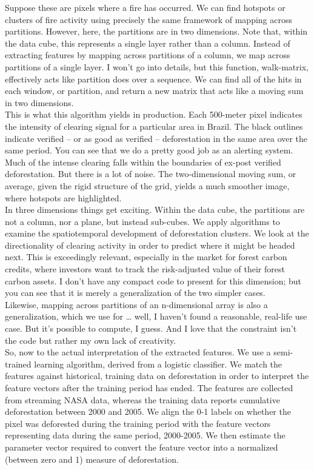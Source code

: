 \documentclass{article}
\begin{document}
Suppose these are pixels where a fire has occurred.  We can find
hotspots or clusters of fire activity using precisely the same
framework of mapping across partitions.  However, here, the partitions
are in two dimensions.  Note that, within the data cube, this
represents a single layer rather than a column.  Instead of extracting
features by mapping across partitions of a column, we map across
partitions of a single layer.  I won't go into details, but this
function, walk-matrix, effectively acts like partition does over a
sequence.  We can find all of the hits in each window, or partition,
and return a new matrix that acts like a moving sum in two dimensions.  \\

This is what this algorithm yields in production.  Each 500-meter
pixel indicates the intensity of clearing signal for a particular area
in Brazil.  The black outlines indicate verified -- or as good as
verified -- deforestation in the same area over the same period.  You
can see that we do a pretty good job as an alerting system.  Much of
the intense clearing falls within the boundaries of ex-post verified
deforestation.  But there is a lot of noise.  The two-dimensional
moving sum, or average, given the rigid structure of the grid, yields
a much smoother image, where hotspots are highlighted.\\

In three dimensions things get exciting.  Within the data cube, the
partitions are not a column, nor a plane, but instead sub-cubes.  We
apply algorithms to examine the spatiotemporal development of
deforestation clusters.  We look at the directionality of clearing
activity in order to predict where it might be headed next.  This is
exceedingly relevant, especially in the market for forest carbon
credits, where investors want to track the risk-adjusted value of
their forest carbon assets.  I don't have any compact code to present
for this dimension; but you can see that it is merely a generalization
of the two simpler cases.\\

Likewise, mapping across partitions of an n-dimensional array is also
a generalization, which we use for \ldots{} well, I haven't found a
reasonable, real-life use case.  But it's possible to compute, I
guess.  And I love that the constraint isn't the code but rather my
own lack of creativity.\\

So, now to the actual interpretation of the extracted features.  We
use a semi-trained learning algorithm, derived from a logistic
classifier.  We match the features against historical, training data
on deforestation in order to interpret the feature vectors after the
training period has ended.  The features are collected from streaming
NASA data, whereas the training data reports cumulative deforestation
between 2000 and 2005.  We align the 0-1 labels on whether the pixel
was deforested during the training period with the feature vectors
representing data during the same period, 2000-2005.  We then estimate
the parameter vector required to convert the feature vector into a
normalized (between zero and 1) measure of deforestation.  \\
\end{document}

